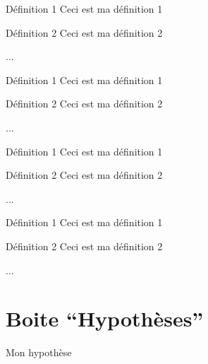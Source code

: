 \documentclass[a4paper,12pt]{article}
\begin{document}
\begin{code}%
\begin{definitions}
	\item[Définition 1] Ceci est ma définition 1
	\item[Définition 2] Ceci est ma définition 2
	\item ...
\end{definitions}
\end{code}

\begin{definitions}
	\item[Définition 1] Ceci est ma définition 1
	\item[Définition 2] Ceci est ma définition 2
	\item ...
\end{definitions}%

\begin{code}%
\begin{definitions*}
	\item[Définition 1] Ceci est ma définition 1
	\item[Définition 2] Ceci est ma définition 2
	\item ...
\end{definitions*}
\end{code}

\begin{definitions*}
	\item[Définition 1] Ceci est ma définition 1
	\item[Définition 2] Ceci est ma définition 2
	\item ...
\end{definitions*}%



	\section{Boite ``Hypothèses''}

\begin{code}%
\begin{hypothese}
	Mon hypothèse
\end{hypothese}
\end{code}
\end{document}
